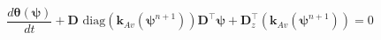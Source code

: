 \begin{equation}
\label{eq:richards-mixed:discrete}
\frac{d \boldsymbol{\theta}(\boldsymbol{\psi})}{d t}
+ \mathbf{D}
    \text{ diag}
    \left(
        \mathbf{k}_{Av}(\boldsymbol{\psi}^{n+1})
    \right)
\mathbf{D}^{\top} \boldsymbol{\psi}
+ \mathbf{D}_z^{\top}
    \left(
        \mathbf{k}_{Av}(\boldsymbol{\psi}^{n+1})
    \right)
=0
\end{equation}
